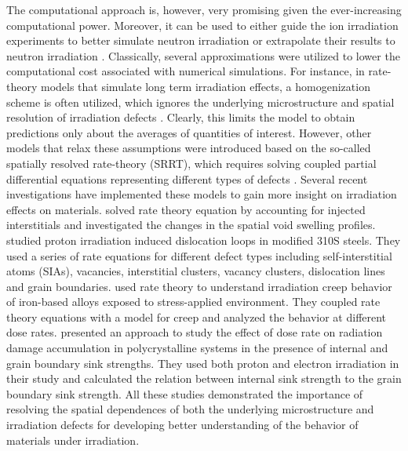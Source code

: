 \documentclass[utf8]{frontiersSCNS} %
\begin{document}
The computational approach is, however, very promising given the ever-increasing computational power. Moreover, it can be used to either guide the ion irradiation experiments to better simulate neutron irradiation or extrapolate their results to neutron irradiation \citep{xu2012}. Classically, several approximations were utilized to lower the computational cost associated with numerical simulations. For instance, in rate-theory models that simulate long term irradiation effects, a homogenization scheme is often utilized, which ignores the underlying microstructure and spatial resolution of irradiation defects \citep{was2017}. Clearly, this limits the model to obtain predictions only about the averages of quantities of interest. However, other models that relax these assumptions were introduced based on the so-called spatially resolved rate-theory (SRRT), which requires solving coupled partial differential equations representing different types of defects \citep{bennett1975, warburton1975, franklin1975, thompson1974, ullmaier1980}. Several recent investigations have implemented these models to gain more insight on irradiation effects on materials. \citep{short2016} solved rate theory equation by accounting for injected interstitials and investigated the changes in the spatial void swelling profiles. \citep{chen2019} studied proton irradiation induced dislocation loops in modified 310S steels. They used a series of rate equations for different defect types including self-interstitial atoms (SIAs), vacancies, interstitial clusters, vacancy clusters, dislocation lines and grain boundaries. \citep{choi2020} used rate theory to understand irradiation creep behavior of iron-based alloys exposed to stress-applied environment. They coupled rate theory equations with a model for creep and analyzed the behavior at different dose rates. \citep{saidi2021} presented an approach to study the effect of dose rate on radiation damage accumulation in polycrystalline systems in the presence of internal and grain boundary sink strengths. They used both proton and electron irradiation in their study and calculated the relation between internal sink strength to the grain boundary sink strength. All these studies demonstrated the importance of resolving the spatial dependences of both the underlying microstructure and irradiation defects for developing better understanding of the behavior of materials under irradiation.
\end{document}
